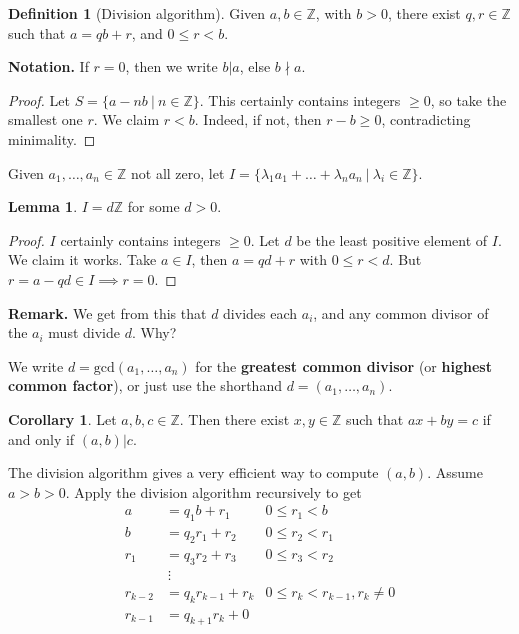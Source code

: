 \documentclass{article}
\theoremstyle{definition}
\newtheorem{lemma}[theorem]{Lemma}
\newtheorem{cor}[theorem]{Corollary}
\newtheorem{defn}[theorem]{Definition}
\theoremstyle{remark}
\begin{document}
\begin{defn}[Division algorithm]
    Given $a,b \in \mathbb{Z}$, with $b>0$, there exist $q,r \in \mathbb{Z}$ such that $a = qb + r$, and $0 \le r < b$.
\end{defn}

\textbf{Notation.} If $r=0$, then we write $b | a$, else $b\nmid a$. 

\begin{proof}
    Let $S = \{a - nb ~|~ n \in \mathbb{Z}\}$. This certainly contains integers $\ge 0$, so take the smallest one $r$. We claim $r < b$. Indeed, if not, then $r - b \ge 0$, contradicting minimality.
\end{proof}

Given $a_1, \ldots, a_n \in \mathbb{Z}$ not all zero, let $I = \{\lambda_1 a_1 + \ldots + \lambda_n a_n ~|~ \lambda_i \in \mathbb{Z}\}$.

\begin{lemma}
    $I = d \mathbb{Z}$ for some $d > 0$.
\end{lemma}
\begin{proof}
    $I$ certainly contains integers $\ge 0$. Let $d$ be the least positive element of $I$. We claim it works. Take $a \in I$, then $a = qd + r$ with $0 \le r < d$. But $r = a - qd \in I \implies r = 0$.
\end{proof}

\textbf{Remark.} We get from this that $d$ divides each $a_i$, and any common divisor of the $a_i$ must divide $d$. Why?

We write $d = \text{gcd}(a_1, \ldots, a_n)$ for the \textbf{greatest common divisor} (or \textbf{highest common factor}), or just use the shorthand $d = (a_1, \ldots, a_n)$.

\begin{cor}
    Let $a,b,c \in \mathbb{Z}$. Then there exist $x,y \in \mathbb{Z}$ such that $ax+by=c$ if and only if $(a,b) | c$.
\end{cor}

The division algorithm gives a very efficient way to compute $(a,b)$. Assume $a>b>0$. Apply the division algorithm recursively to get
\begin{align*}
    a &= q_1 b + r_1 & 0 \leq r_1 < b\\
    b &= q_2 r_1 + r_2 & 0 \leq r_2 < r_1\\
    r_1 &= q_3 r_2 + r_3 & 0 \leq r_3 < r_2\\
    &~ \vdots \\
    r_{k-2} &= q_k r_{k-1} + r_k & 0 \leq r_k < r_{k-1}, r_k \neq0\\
    r_{k-1} &= q_{k+1} r_k + 0
\end{align*}
\end{document}

